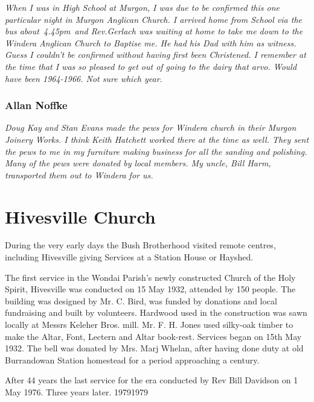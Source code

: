 \emph{When I was in High School at Murgon, I was due to be confirmed this one particular night in Murgon Anglican Church. I arrived home from School via the bus about~4.45pm~and Rev.Gerlach was waiting at home to take me down to the Windera Anglican Church to Baptise me. He had his Dad with him as witness. Guess I couldn't be confirmed without having first been Christened. I remember at the time that I was so pleased to get out of going to the dairy that arvo. Would have been 1964-1966. Not sure which year.}



\subsubsection{Allan Noffke}



\emph{Doug Kay and Stan Evans made the pews for Windera church in their Murgon Joinery Works. I think Keith Hatchett worked there at the time as well. They sent the pews to me in my furniture making business for all the sanding and polishing. Many of the pews were donated by local members. My uncle, Bill Harm, transported them out to Windera for us.}



\section{Hivesville Church}



During the very early days the Bush Brotherhood visited remote centres, including Hivesville giving Services at a Station House or Hayshed.



The first service in the Wondai Parish's newly constructed Church of the Holy Spirit, Hivesville was conducted on 15 May 1932, attended by 150 people. The building was designed by Mr. C. Bird, was funded by donations and local fundraising and built by volunteers. Hardwood used in the construction was sawn locally at Messrs Keleher Bros. mill. Mr. F. H. Jones used silky-oak timber to make the Altar, Font, Lectern and Altar book-rest. Services began on 15th May 1932. The bell was donated by Mrs. Marj Whelan, after having done duty at old Burrandowan Station homestead for a period approaching a century.



After 44 years the last service for the era conducted by Rev Bill Davidson on 1 May 1976. Three years later. 19791979



